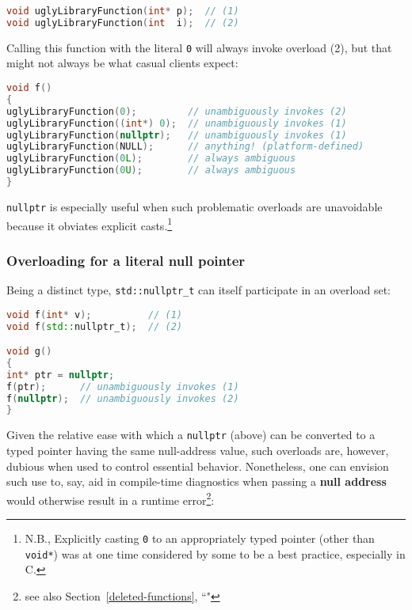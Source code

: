 \begin{lstlisting}[language=C++]
void uglyLibraryFunction(int* p);  // (1)
void uglyLibraryFunction(int  i);  // (2)
\end{lstlisting}


\noindent Calling this function with the literal \texttt{0} will always invoke
overload (2), but that might not always be what casual clients expect:

\begin{lstlisting}[language=C++]
void f()
{
uglyLibraryFunction(0);         // unambiguously invokes (2)
uglyLibraryFunction((int*) 0);  // unambiguously invokes (1)
uglyLibraryFunction(nullptr);   // unambiguously invokes (1)
uglyLibraryFunction(NULL);      // anything! (platform-defined)
uglyLibraryFunction(0L);        // always ambiguous
uglyLibraryFunction(0U);        // always ambiguous
}
\end{lstlisting}


\noindent\texttt{nullptr} is especially useful when such problematic overloads
are unavoidable because it obviates explicit
casts.{\cprotect\footnote{N.B., Explicitly casting \texttt{0} to an
appropriately typed pointer (other than \texttt{void*}) was at one
time considered by some to be a best practice, especially in C.}}

\subsubsection[Overloading for a literal null pointer]{Overloading for a literal null pointer}\label{overloading-for-a-literal-null-pointer}

Being a distinct type, \texttt{std::nullptr\_t} can itself participate
in an overload set:

\begin{lstlisting}[language=C++]
void f(int* v);          // (1)
void f(std::nullptr_t);  // (2)

void g()
{
int* ptr = nullptr;
f(ptr);      // unambiguously invokes (1)
f(nullptr);  // unambiguously invokes (2)
}
\end{lstlisting}


\noindent Given the relative ease with which a \texttt{nullptr} (above) can be
converted to a typed pointer having the same null-address value, such
overloads are, however, dubious when used to control essential behavior.
Nonetheless, one can envision such use to, say, aid in compile-time
diagnostics when passing a \textbf{null address} would otherwise result in
a runtime error\footnote{see also Section~\ref{deleted-functions}, ``"}:


